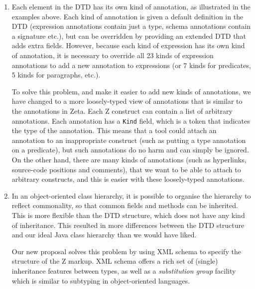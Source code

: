 \documentclass{llncs}  %
\begin{document}
\begin{enumerate}
\item Each element in the DTD has its own kind of annotation, as
  illustrated in the examples above.  Each kind of annotation is given
  a default definition in the DTD (expression annotations contain just a
  type, schema annotations contain a signature etc.), but can be
  overridden by providing an extended DTD that adds extra fields.
  However, because each kind of expression has its own kind of annotation,
  it is necessary to override all 23 kinds of expression annotations
  to add a new annotation to expressions (or 7 kinds for predicates, 
  5 kinds for paragraphs, etc.).
  
  To solve this problem, and make it easier to add new kinds of
  annotations, we have changed to a more loosely-typed view of annotations
  that is similar to the annotations in Zeta.  Each Z construct can contain
  a list of arbitrary annotations.  Each annotation has a \verb!Kind!
  field, which is a token that indicates the type of the annotation.  This
  means that a tool could attach an annotation to an inappropriate
  construct (such as putting a type annotation on a predicate), but such
  annotations do no harm and can simply be ignored.  On the other hand,
  there are many kinds of annotations (such as hyperlinks, source-code
  positions and comments), that we want to be able to attach to arbitrary
  constructs, and this is easier with these loosely-typed annotations.
  
\item In an object-oriented class hierarchy, it is possible to organise
  the hierarchy to reflect commonality, so that common fields and methods
  can be inherited.  This is more flexible than the DTD structure, which
  does not have any kind of inheritance.  This resulted in more differences
  between the DTD structure and our ideal Java class hierarchy than we
  would have liked. 

  Our new proposal solves this problem by using XML schema to specify the
  structure of the Z markup.  XML schema offers a rich set of (single)
  inheritance features between types, as well as a \emph{substitution
  group} facility which is similar to subtyping in object-oriented
  languages.  
\end{enumerate}
\end{document}
